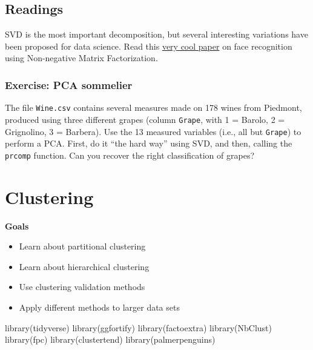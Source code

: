 \documentclass[
  letterpaper,
  DIV=11,
  numbers=noendperiod]{scrreprt}
\newenvironment{Shaded}{\begin{snugshade}}{\end{snugshade}}
\newcommand{\FunctionTok}[1]{\textcolor[rgb]{0.28,0.35,0.67}{#1}}
\newcommand{\NormalTok}[1]{\textcolor[rgb]{0.00,0.23,0.31}{#1}}
\providecommand{\tightlist}{%
  \setlength{\itemsep}{0pt}\setlength{\parskip}{0pt}}\usepackage{longtable,booktabs,array}
\begin{document}
\hypertarget{readings-1}{%
\section{Readings}\label{readings-1}}

SVD is the most important decomposition, but several interesting
variations have been proposed for data science. Read this
\href{http://www.columbia.edu/~jwp2128/Teaching/E4903/papers/nmf_nature.pdf}{very
cool paper} on face recognition using Non-negative Matrix Factorization.

\hypertarget{exercise-pca-sommelier}{%
\subsection{Exercise: PCA sommelier}\label{exercise-pca-sommelier}}

The file \texttt{Wine.csv} contains several measures made on 178 wines
from Piedmont, produced using three different grapes (column
\texttt{Grape}, with 1 = Barolo, 2 = Grignolino, 3 = Barbera). Use the
13 measured variables (i.e., all but \texttt{Grape}) to perform a PCA.
First, do it ``the hard way'' using SVD, and then, calling the
\texttt{prcomp} function. Can you recover the right classification of
grapes?


\hypertarget{clustering}{%
\chapter{Clustering}\label{clustering}}

\textbf{Goals}

\begin{itemize}
\tightlist
\item
  Learn about partitional clustering
\item
  Learn about hierarchical clustering
\item
  Use clustering validation methods
\item
  Apply different methods to larger data sets
\end{itemize}

\begin{Shaded}
\begin{Highlighting}[]
\FunctionTok{library}\NormalTok{(tidyverse) }
\FunctionTok{library}\NormalTok{(ggfortify) }
\FunctionTok{library}\NormalTok{(factoextra) }
\FunctionTok{library}\NormalTok{(NbClust)}
\FunctionTok{library}\NormalTok{(fpc)}
\FunctionTok{library}\NormalTok{(clustertend)}
\FunctionTok{library}\NormalTok{(palmerpenguins)}
\end{Highlighting}
\end{Shaded}
\end{document}
